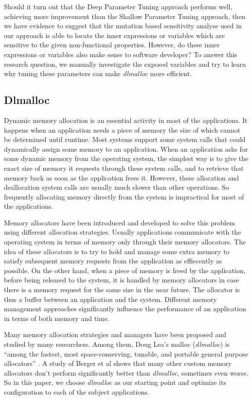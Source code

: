 Should it turn out that the Deep Parameter Tuning approach performs well, achieving more improvement than the Shallow Parameter Tuning approach, then we have evidence to suggest that the mutation based sensitivity analyse used in our approach is able to locate the inner expressions or variables which are sensitive to the given non-functional properties. However, do these inner expressions or variables also make sense to software developer? To answer this research question, we manually investigate the exposed variables and try to learn why tuning these parameters can make \emph{dlmalloc} more efficient.  


\subsection{Dlmalloc}

Dynamic memory allocation is an essential activity in most of the applications. It happens when an application needs a piece of memory the size of which cannot be determined until runtime. Most systems support some system calls that could dynamically assign some memory to an application. When an application asks for some dynamic memory from the operating system, the simplest way is to give the exact size of memory it requests through these system calls, and to retrieve that memory back as soon as the application frees it. However, these allocation and deallocation system calls are usually much slower than other operations. So frequently allocating memory directly from the system is impractical for most of the applications. 

Memory allocators have been introduced and developed to solve this problem using different allocation strategies. Usually applications communicate with the operating system in terms of memory only through their memory allocators. The idea of these allocators is to try to hold and manage some extra memory to satisfy subsequent memory requests from the application as effiecently as possible. On the other hand, when a piece of memory is freed by the application, before being released to the system, it is handled by memory allocators in case there is a memory request for the same size in the near future. The allocator is thus a buffer between an application and the system. Different memory management approaches significantly influence the performance of an application in terms of both memory and time.

Many memory allocation strategies and managers have been proposed and studied by many researchers. Among them, Doug Lea's malloc (\emph{dlmalloc}) is ``among the fastest, most space-conserving, tunable, and portable general purpose allocators'' \cite{lea1996memory}. A study of Berger et al \cite{Berger:2002:RCM:583854.582421} shows that many other custom memory allocators don't perform significantly better than \emph{dlmalloc}, sometimes even worse. So in this paper, we choose \emph{dlmalloc} as our starting point and optimize its configuration to each of the subject applications.

